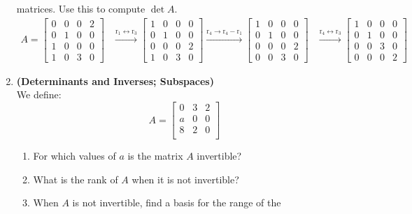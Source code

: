 \documentclass[red]{tutorial}
\newcommand{\mat}[1]{\begin{bmatrix} #1 %
\end{bmatrix}}
\newcommand{\row}[1]{\mathrm{r}_{#1}}
\theoremstyle{definition}
\theoremstyle{theorem}
\begin{document}
\begin{tutorial}
\begin{enumerate}
      matrices. Use this to compute $\det A$.
      \begin{align*}
        A = \begin{bmatrix}
          0 & 0 & 0 & 2 \\
          0 & 1 & 0 & 0 \\
          1 & 0 & 0 & 0 \\
          1 & 0 & 3 & 0
        \end{bmatrix}
        &\xrightarrow{\row{1} \leftrightarrow \row{3}}
        \begin{bmatrix}
          1 & 0 & 0 & 0 \\
          0 & 1 & 0 & 0 \\
          0 & 0 & 0 & 2 \\
          1 & 0 & 3 & 0
        \end{bmatrix}
        \xrightarrow{\row{4} \to \row{4}-\row{1}}
        \begin{bmatrix}
          1 & 0 & 0 & 0 \\
          0 & 1 & 0 & 0 \\
          0 & 0 & 0 & 2 \\
          0 & 0 & 3 & 0
        \end{bmatrix}
        &\xrightarrow{\row{4} \leftrightarrow \row{3}}
        \begin{bmatrix}
          1 & 0 & 0 & 0 \\
          0 & 1 & 0 & 0 \\
          0 & 0 & 3 & 0 \\
          0 & 0 & 0 & 2
        \end{bmatrix}
      \end{align*}
    \item \label{q:determinants} \textbf{(Determinants and Inverses; Subspaces)}\\
      We define:
      \begin{equation*}
        A =
        \mat{
          0 & 3 & 2 \\
          a & 0 & 0 \\
          8 & 2 & 0 \\
        }
      \end{equation*}
      \begin{enumerate}
        \item For which values of $a$ is the matrix $A$ invertible?
        \item What is the rank of $A$ when it is not invertible?
        \item When $A$ is not invertible, find a basis for the range of the

\end{enumerate}
\end{enumerate}
\end{tutorial}
\end{document}
